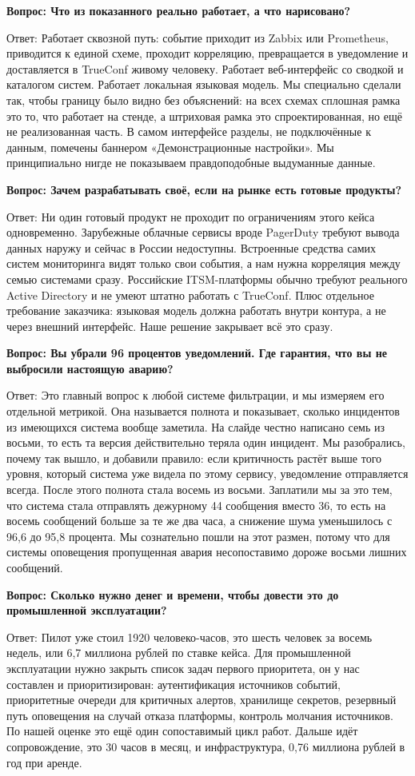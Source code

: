 \documentclass[11pt]{article}
\newcommand{\qa}[2]{%
\par\vspace{7pt}%
{\bfseries Вопрос: #1}\par\vspace{2pt}
{Ответ: #2}\par\vspace{4pt}}
\begin{document}
\qa{Что из показанного реально работает, а что нарисовано?}
{Работает сквозной путь: событие приходит из Zabbix или Prometheus, приводится
к единой схеме, проходит корреляцию, превращается в уведомление и доставляется
в TrueConf живому человеку. Работает веб-интерфейс со сводкой и каталогом
систем. Работает локальная языковая модель. Мы специально сделали так, чтобы
границу было видно без объяснений: на всех схемах сплошная рамка это то, что
работает на стенде, а штриховая рамка это спроектированная, но ещё не
реализованная часть. В самом интерфейсе разделы, не подключённые к данным,
помечены баннером «Демонстрационные настройки». Мы принципиально нигде не
показываем правдоподобные выдуманные данные.}

\qa{Зачем разрабатывать своё, если на рынке есть готовые продукты?}
{Ни один готовый продукт не проходит по ограничениям этого кейса
одновременно. Зарубежные облачные сервисы вроде PagerDuty требуют вывода
данных наружу и сейчас в России недоступны. Встроенные средства самих систем
мониторинга видят только свои события, а нам нужна корреляция между семью
системами сразу. Российские ITSM-платформы обычно требуют реального Active
Directory и не умеют штатно работать с TrueConf. Плюс отдельное требование
заказчика: языковая модель должна работать внутри контура, а не через внешний
интерфейс. Наше решение закрывает всё это сразу.}

\qa{Вы убрали 96 процентов уведомлений. Где гарантия, что вы не выбросили
настоящую аварию?}
{Это главный вопрос к любой системе фильтрации, и мы измеряем его отдельной
метрикой. Она называется полнота и показывает, сколько инцидентов из
имеющихся система вообще заметила. На слайде честно написано семь из восьми,
то есть та версия действительно теряла один инцидент. Мы разобрались, почему
так вышло, и добавили правило: если критичность растёт выше того уровня,
который система уже видела по этому сервису, уведомление отправляется всегда.
После этого полнота стала восемь из восьми. Заплатили мы за это тем, что
система стала отправлять дежурному 44 сообщения вместо 36, то есть на восемь
сообщений больше за те же два часа, а снижение шума уменьшилось с 96,6 до
95,8 процента. Мы сознательно пошли на этот размен, потому что для системы
оповещения пропущенная авария несопоставимо дороже восьми лишних сообщений.}

\qa{Сколько нужно денег и времени, чтобы довести это до промышленной
эксплуатации?}
{Пилот уже стоил 1920 человеко-часов, это шесть человек за восемь недель, или
6,7 миллиона рублей по ставке кейса. Для промышленной эксплуатации нужно
закрыть список задач первого приоритета, он у нас составлен и приоритизирован:
аутентификация источников событий, приоритетные очереди для критичных алертов,
хранилище секретов, резервный путь оповещения на случай отказа платформы,
контроль молчания источников. По нашей оценке это ещё один сопоставимый цикл
работ. Дальше идёт сопровождение, это 30 часов в месяц, и инфраструктура,
0,76 миллиона рублей в год при аренде.}
\end{document}
